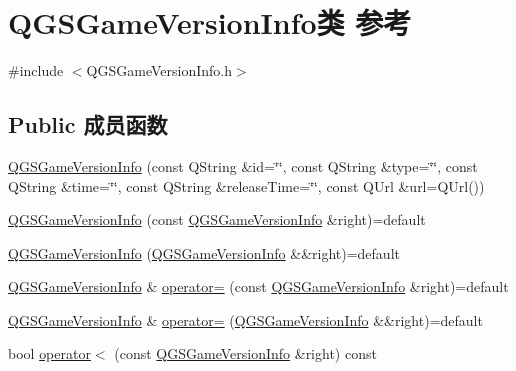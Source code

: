 \hypertarget{class_q_g_s_game_version_info}{}\section{Q\+G\+S\+Game\+Version\+Info类 参考}
\label{class_q_g_s_game_version_info}


{\ttfamily \#include $<$Q\+G\+S\+Game\+Version\+Info.\+h$>$}

\subsection*{Public 成员函数}
\begin{DoxyCompactItemize}
\item 
\mbox{\hyperlink{class_q_g_s_game_version_info_a15d1b9ac6be0a5b4ca7b78b7737e3866}{Q\+G\+S\+Game\+Version\+Info}} (const Q\+String \&id=\char`\"{}\char`\"{}, const Q\+String \&type=\char`\"{}\char`\"{}, const Q\+String \&time=\char`\"{}\char`\"{}, const Q\+String \&release\+Time=\char`\"{}\char`\"{}, const Q\+Url \&url=Q\+Url())
\item 
\mbox{\hyperlink{class_q_g_s_game_version_info_a784da4680f9f531ecdd0a0479c33b3be}{Q\+G\+S\+Game\+Version\+Info}} (const \mbox{\hyperlink{class_q_g_s_game_version_info}{Q\+G\+S\+Game\+Version\+Info}} \&right)=default
\item 
\mbox{\hyperlink{class_q_g_s_game_version_info_a9e2c505216ec0635f956509c0473f2d9}{Q\+G\+S\+Game\+Version\+Info}} (\mbox{\hyperlink{class_q_g_s_game_version_info}{Q\+G\+S\+Game\+Version\+Info}} \&\&right)=default
\item 
\mbox{\hyperlink{class_q_g_s_game_version_info}{Q\+G\+S\+Game\+Version\+Info}} \& \mbox{\hyperlink{class_q_g_s_game_version_info_a28b7669a3daedffd2a9b3d9120ee983a}{operator=}} (const \mbox{\hyperlink{class_q_g_s_game_version_info}{Q\+G\+S\+Game\+Version\+Info}} \&right)=default
\item 
\mbox{\hyperlink{class_q_g_s_game_version_info}{Q\+G\+S\+Game\+Version\+Info}} \& \mbox{\hyperlink{class_q_g_s_game_version_info_a19df4036b3bc906166d453512df5b21b}{operator=}} (\mbox{\hyperlink{class_q_g_s_game_version_info}{Q\+G\+S\+Game\+Version\+Info}} \&\&right)=default
\item 
bool \mbox{\hyperlink{class_q_g_s_game_version_info_a6a6092517cab6ac578630e0a3e95bc70}{operator$<$}} (const \mbox{\hyperlink{class_q_g_s_game_version_info}{Q\+G\+S\+Game\+Version\+Info}} \&right) const
\item 

\end{DoxyCompactItemize}
